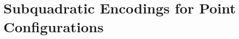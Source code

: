 \chapter{Subquadratic Encodings for Point Configurations}
\label{chapter:order-type-encoding}







